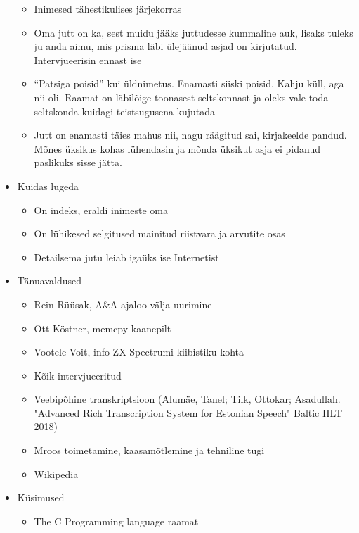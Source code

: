 \documentclass{tufte-book}
\begin{document}
\begin{itemize}
\begin{itemize}
		\item Inimesed tähestikulises järjekorras	
		\item Oma jutt on ka, sest muidu jääks juttudesse kummaline auk, lisaks tuleks ju anda aimu, mis prisma läbi ülejäänud asjad on kirjutatud. Intervjueerisin ennast ise
		\item \enquote{Patsiga poisid} kui üldnimetus. Enamasti siiski poisid. Kahju küll, aga nii oli. Raamat on läbilõige toonasest seltskonnast ja oleks vale toda seltskonda kuidagi teistsugusena kujutada
		\item Jutt on enamasti täies mahus nii, nagu räägitud sai, kirjakeelde pandud. Mõnes üksikus kohas lühendasin ja mõnda üksikut asja ei pidanud paslikuks sisse jätta. 
	\end{itemize}
	\item Kuidas lugeda
	\begin{itemize}
		\item On indeks, eraldi inimeste oma
		\item On lühikesed selgitused mainitud riistvara ja arvutite osas
		\item Detailsema jutu leiab igaüks ise Internetist
	\end{itemize}
	\item Tänuavaldused
	\begin{itemize}
		\item Rein Rüüsak, A\&A ajaloo välja uurimine
		\item Ott Köstner, memcpy kaanepilt
		\item Vootele Voit, info ZX Spectrumi kiibistiku kohta
		\item Kõik intervjueeritud
		\item Veebipõhine transkriptsioon (Alumäe, Tanel; Tilk, Ottokar; Asadullah. "Advanced Rich Transcription System for Estonian Speech" Baltic HLT 2018)
		\item Mroos toimetamine, kaasamõtlemine ja tehniline tugi
		\item Wikipedia
	\end{itemize}
	\item Küsimused
	\begin{itemize}
		\item The C Programming language raamat
	\end{itemize}
 \end{itemize}
 
\end{document}
